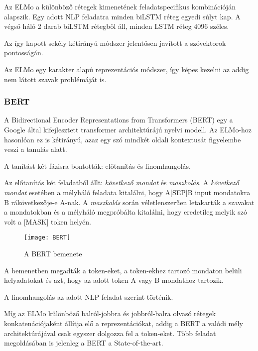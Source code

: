 Az ELMo a különböző rétegek kimenetének feladatspecifikus kombinációján alapszik. Egy adott NLP feladatra minden biLSTM réteg egyedi súlyt kap. A végső háló 2 darab biLSTM rétegből áll, minden LSTM réteg 4096 széles.

Az így kapott sekély kétirányú módszer jelentősen javított a szóvektorok pontosságán.

\begin{note}
	Az ELMo egy karakter alapú reprezentációs módszer, így képes kezelni az addig nem látott szavak problémáját is.
\end{note}

\subsubsection{BERT}
A Bidirectional Encoder Representations from Transformers (BERT) egy a Google által kifejlesztett transformer architektúrájú nyelvi modell. Az ELMo-hoz hasonlóan ez is kétirányú, azaz egy szó mindkét oldali kontextusát figyelembe veszi a tanulás alatt. 

A tanítást két fázisra bontották: előtanítás és finomhangolás.

Az előtanítás két feladatból állt: \textit{következő mondat} és \textit{maszkolás}. A \textit{következő mondat} esetében a mélyháló feladata kitalálni, hogy A[SEP]B input mondatokra B rákövetkezője-e A-nak. A \textit{maszkolás} során véletlenszerűen letakarták a szavakat a mondatokban és a mélyháló megpróbálta kitalálni, hogy eredetileg melyik szó volt a [MASK] token helyén.

\begin{figure}[H]
	\centering
	\texttt{[image: BERT]}
	\caption{A BERT bemenete}
\end{figure}

A bemenetben megadták a token-eket, a token-ekhez tartozó mondaton belüli helyadatokat és azt, hogy az adott token A vagy B mondathoz tartozik.


A finomhangolás az adott NLP feladat szerint történik.

\begin{note}
	Míg az ELMo különböző balról-jobbra és jobbról-balra olvasó rétegek konkatenációjaként állítja elő a reprezentációkat, addig a BERT a valódi mély architektúrájával csak egyszer dolgozza fel a token-eket. Több feladat megoldásában is jelenleg a BERT a State-of-the-art.
\end{note}



